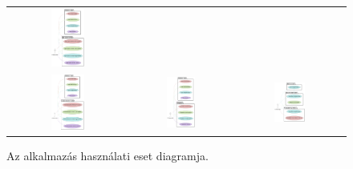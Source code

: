 \begin{figure}[!ht]
\begin{tabular}{ccc}
        \includegraphics[width=0.30\textwidth, height=0.4\textheight]{figures/TrueFalseQuestion Diagram.png} \\
        
        \includegraphics[width=0.30\textwidth, height=0.4\textheight]{figures/MultipleChoiceQuestion Diagram.png} & 
        \includegraphics[width=0.30\textwidth, height=0.4\textheight]{figures/Exam Diagram.png} & 
        \includegraphics[width=0.30\textwidth, height=0.4\textheight]{figures/AnswerCheck Diagram.png}
    \end{tabular}
    \caption{Az alkalmazás használati eset diagramja.}
    \label{fig:UsecaseDiagram}
\end{figure}
